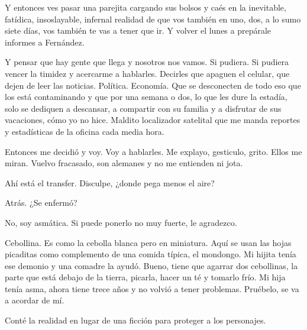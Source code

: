 \documentclass[11pt,twoside,openright,a6paper]{book}
\begin{document}
Y entonces ves pasar una parejita cargando sus bolsos y caés en la inevitable, fatídica, insoslayable, infernal realidad de que vos también en uno, dos, a lo sumo siete días, vos también te vas a tener que ir. Y volver el lunes a prepárale informes a Fernández.

\vspace{0.5cm}

Y pensar que hay gente que llega y nosotros nos vamos. Si pudiera. Si pudiera vencer la timidez y acercarme a hablarles. Decirles que apaguen el celular, que dejen de leer las noticias. Política. Economía. Que se desconecten de todo eso que los está contaminando y que por una semana o dos, lo que les dure la estadía, solo se dediquen a descansar, a compartir con su familia y a disfrutar de sus vacaciones, cómo yo no hice. Maldito localizador satelital que me manda reportes y estadísticas de la oficina cada media hora. 

Entonces me decidió y voy. Voy a hablarles. Me explayo, gesticulo, grito. Ellos me miran. Vuelvo fracasado, son alemanes y no me entienden ni jota.

\vspace{0.5cm}

Ahí está el transfer. Disculpe, ¿donde pega menos el aire?

Atrás. ¿Se enfermó?

No, soy asmática. Si puede ponerlo no muy fuerte, le agradezco.

Cebollina. Es como la cebolla blanca pero en miniatura. Aquí se usan las hojas picaditas como complemento de una comida típica, el mondongo. Mi hijita tenía ese demonio y una comadre la ayudó. Bueno, tiene que agarrar dos cebollinas, la parte que está debajo de la tierra, picarla, hacer un té y tomarlo frío. Mi hija tenía asma, ahora tiene trece años y no volvió a tener problemas. Pruébelo, se va a acordar de mí.

\vspace{0.5cm}

Conté la realidad en lugar de una ficción para proteger a los personajes.
\end{document}
